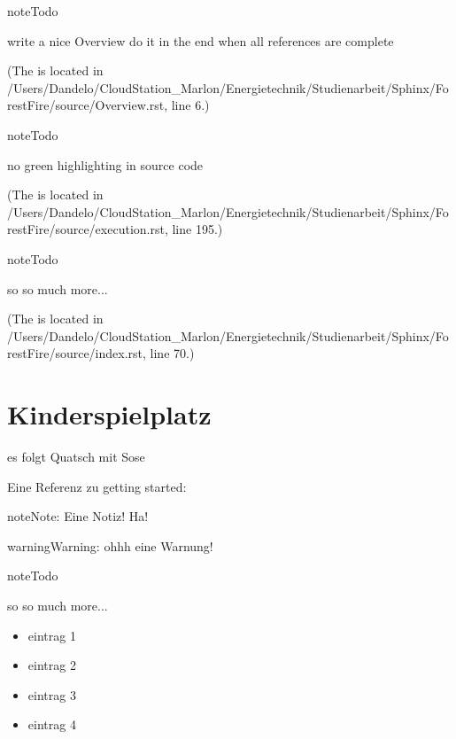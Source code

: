 \documentclass[letterpaper,10pt,english]{sphinxmanual}
\begin{document}
\begin{sphinxadmonition}{note}{Todo}

write a nice Overview
do it in the end when all references are complete
\end{sphinxadmonition}

(The {\hyperref[\detokenize{Overview:index-0}]{}} is located in /Users/Dandelo/CloudStation\_Marlon/Energietechnik/Studienarbeit/Sphinx/ForestFire/source/Overview.rst, line 6.)

\begin{sphinxadmonition}{note}{Todo}

no green highlighting in source code
\end{sphinxadmonition}

(The {\hyperref[\detokenize{execution:index-0}]{}} is located in /Users/Dandelo/CloudStation\_Marlon/Energietechnik/Studienarbeit/Sphinx/ForestFire/source/execution.rst, line 195.)

\begin{sphinxadmonition}{note}{Todo}

so so much more...
\end{sphinxadmonition}

(The {\hyperref[\detokenize{index:index-0}]{}} is located in /Users/Dandelo/CloudStation\_Marlon/Energietechnik/Studienarbeit/Sphinx/ForestFire/source/index.rst, line 70.)


\chapter{Kinderspielplatz}
\label{\detokenize{index:kinderspielplatz}}
es folgt Quatsch mit Sose

Eine Referenz zu getting started: {\hyperref[\detokenize{index:get-started}]{}}

\begin{sphinxadmonition}{note}{Note:}
Eine Notiz! Ha!
\end{sphinxadmonition}

\begin{sphinxadmonition}{warning}{Warning:}
ohhh eine Warnung!
\end{sphinxadmonition}

\begin{sphinxadmonition}{note}{Todo}

so so much more...
\end{sphinxadmonition}
\begin{itemize}\setlength{\itemsep}{0pt}\setlength{\parskip}{0pt}
\item {} 
eintrag 1

\item {} 
eintrag 2

\item {} 
eintrag 3

\item {} 
eintrag 4

\end{itemize}
\end{document}
